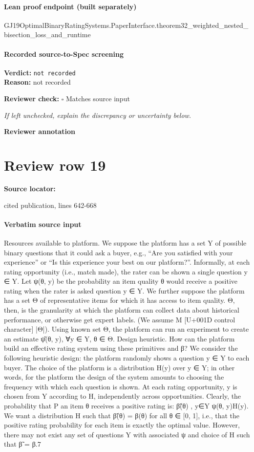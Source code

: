 \documentclass[10pt]{article}
\newcommand{\reviewerbox}{%
  \par\noindent\fbox{\parbox{0.96\linewidth}{\rule{0pt}{0.38in}}}\par
}
\newcommand{\reviewmatch}[1]{%
  \par\noindent\textbf{Reviewer check:} $\square$\; #1\par
  \noindent\emph{If left unchecked, explain the discrepancy or uncertainty below.}\par
}
\begin{document}
\paragraph{Lean proof endpoint (built separately)}\begin{ReviewVerbatim}
GJ19OptimalBinaryRatingSystems.PaperInterface.theorem32_weighted_nested_bisection_loss_and_runtime
\end{ReviewVerbatim}

\paragraph{Recorded source-to-Spec screening}
\textbf{Verdict:} \texttt{not recorded}
\\
\textbf{Reason:} not recorded
\reviewmatch{Matches source input}
\noindent\textbf{Reviewer annotation}\par
\reviewerbox
\clearpage
\hypertarget{source-claim-7159be549a8d27ef}{}
\section*{Review row 19}
\textbf{Source locator:} {\footnotesize\raggedright cited publication, lines 642-\allowbreak{}668\par}
\paragraph{Verbatim source input}
\begin{ReviewVerbatim}
Resources available to platform. We suppose
the platform has a set Y of possible binary questions that it could ask a buyer, e.g., “Are you satisfied with your experience” or “Is this experience
your best on our platform?”. Informally, at each
rating opportunity (i.e., match made), the rater can
be shown a single question y ∈ Y. Let ψ(θ, y) be the
probability an item quality θ would receive a positive
rating when the rater is asked question y ∈ Y.
We further suppose the platform has a set Θ of representative items for which it has access to item quality. Θ, then, is the granularity at which the platform
can collect data about historical performance, or
otherwise get expert labels. (We assume M [U+001D control character] |Θ|).
Using known set Θ, the platform can run an experiment to create an estimate ψ̂(θ, y), ∀y ∈ Y, θ ∈ Θ.
Design heuristic. How can the platform build an
effective rating system using these primitives and
β? We consider the following heuristic design: the
platform randomly shows a question y ∈ Y to each
buyer. The choice of the platform is a distribution
H(y) over y ∈ Y; in other words, for the platform
the design of the system amounts to choosing the frequency with which each question is shown. At each
rating opportunity, y is chosen from Y according to
H, independently across opportunities.
Clearly, the probability that
P an item θ receives a
positive rating is: β̃(θ) , y∈Y ψ(θ, y)H(y).
We want a distribution H such that β̃(θ) = β(θ) for
all θ ∈ [0, 1], i.e., that the positive rating probability
for each item is exactly the optimal value. However,
there may not exist any set of questions Y with associated ψ and choice of H such that β̃ = β.7
\end{ReviewVerbatim}
\end{document}
